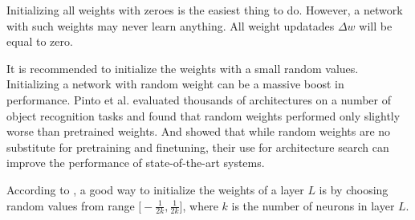 Initializing all weights with zeroes is the easiest thing to do. However, a network with such weights may never learn anything. All weight updatades $\Delta w$ will be equal to zero.

It is recommended to initialize the weights with a small random values. Initializing a network with random weight can be a massive boost in performance. Pinto et al.\cite{Pinto-et-al-2008} evaluated thousands of architectures on a number of object recognition tasks and found that random weights performed only slightly worse than pretrained weights. And \cite{Saxe-et-al-2011} showed that while random weights are no substitute for pretraining and finetuning, their use for architecture search can improve the performance of state-of-the-art systems. 

According to \cite{Trushevskyi-2014}, a good way to initialize the weights of a layer $L$ is by choosing random values from range $\big[-\frac{1}{2k}, \frac{1}{2k}\big]$, where $k$ is the number of neurons in layer $L$.
